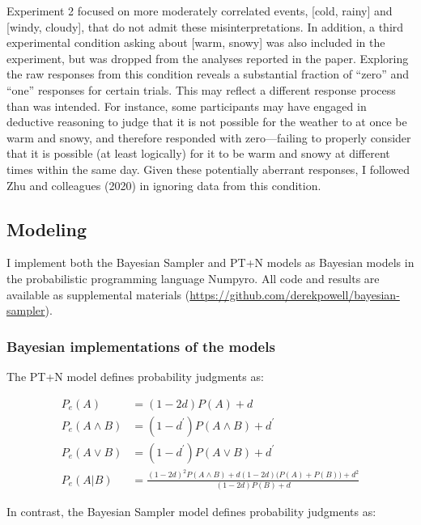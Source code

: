 \documentclass[
  english,
  man,floatsintext]{apa6}
\begin{document}
Experiment 2 focused on more moderately correlated events, {[}cold, rainy{]} and {[}windy, cloudy{]}, that do not admit these misinterpretations. In addition, a third experimental condition asking about {[}warm, snowy{]} was also included in the experiment, but was dropped from the analyses reported in the paper. Exploring the raw responses from this condition reveals a substantial fraction of ``zero'' and ``one'' responses for certain trials. This may reflect a different response process than was intended. For instance, some participants may have engaged in deductive reasoning to judge that it is not possible for the weather to at once be warm and snowy, and therefore responded with zero---failing to properly consider that it is possible (at least logically) for it to be warm and snowy at different times within the same day. Given these potentially aberrant responses, I followed Zhu and colleagues (2020) in ignoring data from this condition.

\hypertarget{modeling}{%
\subsection{Modeling}\label{modeling}}

I implement both the Bayesian Sampler and PT+N models as Bayesian models in the probabilistic programming language Numpyro. All code and results are available as supplemental materials (\url{https://github.com/derekpowell/bayesian-sampler}).

\hypertarget{bayesian-implementations-of-the-models}{%
\subsubsection{Bayesian implementations of the models}\label{bayesian-implementations-of-the-models}}

The PT+N model defines probability judgments as:

\begin{align*}
  P_{e}(A) &= (1-2d)P(A) + d \\
  P_e(A\land B) &= (1-d^\prime)P(A \land B)+d^\prime \\
  P_e(A\lor B) &= (1-d^\prime)P(A \lor B)+d^\prime \\
  P_e(A|B) &= \frac{(1-2d)^2P(A \land B) + d(1-2d)\big(P(A)+P(B)\big)+d^2}{(1-2d)P(B)+d}
\end{align*}

In contrast, the Bayesian Sampler model defines probability judgments as:
\end{document}
